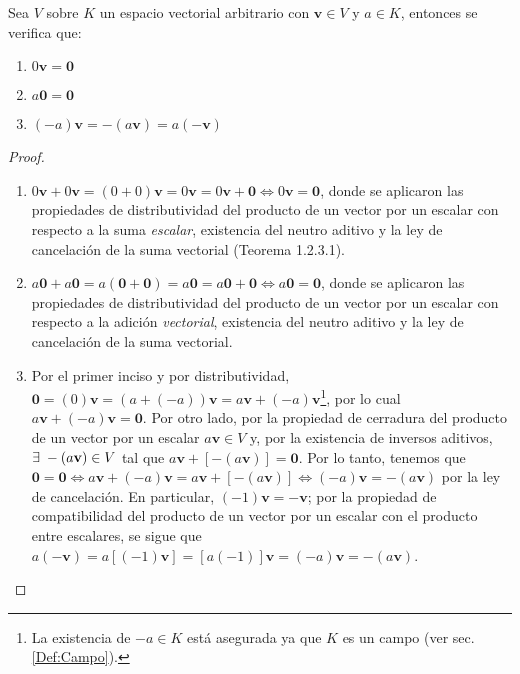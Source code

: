 \documentclass[12pt,dvipsnames]{article}
\newenvironment{teorema}[2][Teorema]{\begin{trivlist}
\item[\hskip \labelsep {\bfseries #1}\hskip \labelsep {\bfseries #2.}]}{\end{trivlist}}
\begin{document}
\begin{teorema} {1.2.3.2}
Sea $V$ sobre $K$ un espacio vectorial arbitrario con $\mathbf{v}\in V$ y $a\in K$, entonces se verifica que:

\begin{enumerate}
    \item $0\mathbf{v}=\mathbf{0}$
    \item $a\mathbf{0}=\mathbf{0}$
    \item $(-a)\mathbf{v}=-(a\mathbf{v})=a(-\mathbf{v})$
\end{enumerate}

\begin{proof}
\begin{enumerate}
    \item $0\mathbf{v}+0\mathbf{v}=(0+0)\mathbf{v}=0\mathbf{v}=0\mathbf{v}+\mathbf{0}\iff0\mathbf{v}=\mathbf{0}$, donde se aplicaron las propiedades de distributividad del producto de un vector por un escalar con respecto a la suma \emph{escalar}, existencia del neutro aditivo y la ley de cancelación de la suma vectorial (Teorema 1.2.3.1).
    \item $a\mathbf{0}+a\mathbf{0}=a(\mathbf{0}+\mathbf{0})=a\mathbf{0}=a\mathbf{0}+\mathbf{0}\iff a\mathbf{0}=\mathbf{0}$, donde se aplicaron las propiedades de distributividad del producto de un vector por un escalar con respecto a la adición \emph{vectorial}, existencia del neutro aditivo y la ley de cancelación de la suma vectorial.
    \item Por el primer inciso y por distributividad, $\mathbf{0} = (0)\mathbf{v} = (a+(-a))\mathbf{v}=a\mathbf{v}+(-a)\mathbf{v}$\footnote{La existencia de $-a\in K$ está asegurada ya que $K$ es un campo (ver sec. \ref{Def:Campo}).}, por lo cual $a\mathbf{v}+(-a)\mathbf{v}=\mathbf{0}$. Por otro lado, por la propiedad de cerradura del producto de un vector por un escalar $a\mathbf{v}\in V$ y, por la existencia de inversos aditivos, $\exists\hspace{1mm}-(a\mathbf{v})\in V$ tal que $a\mathbf{v}+[-(a\mathbf{v})]=\mathbf{0}$. Por lo tanto, tenemos que $\mathbf{0}=\mathbf{0}\iff a\mathbf{v}+(-a)\mathbf{v}=a\mathbf{v}+[-(a\mathbf{v})]\iff (-a)\mathbf{v}=-(a\mathbf{v})$ por la ley de cancelación. En particular, $(-1)\mathbf{v}=-\mathbf{v}$; por la propiedad de compatibilidad del producto de un vector por un escalar con el producto entre escalares, se sigue que $a(-\mathbf{v})=a[(-1)\mathbf{v}]=[a(-1)]\mathbf{v}=(-a)\mathbf{v}=-(a\mathbf{v})$.
\end{enumerate}
\end{proof}
\end{teorema}
\end{document}
